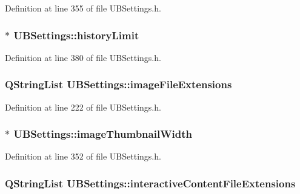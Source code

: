 Definition at line 355 of file U\-B\-Settings.\-h.

\hypertarget{class_u_b_settings_a7611712c43c9117dc809ba0a9cd4488f}{
\subsubsection[{history\-Limit}]{$\ast$ U\-B\-Settings\-::history\-Limit}}\label{db/d66/class_u_b_settings_a7611712c43c9117dc809ba0a9cd4488f}


Definition at line 380 of file U\-B\-Settings.\-h.

\hypertarget{class_u_b_settings_aafb3902650405393aa5b1fee66a59159}{
\subsubsection[{image\-File\-Extensions}]{\setlength{\rightskip}{0pt plus 5cm}Q\-String\-List U\-B\-Settings\-::image\-File\-Extensions\hspace{0.3cm}{\ttfamily [static]}}}\label{db/d66/class_u_b_settings_aafb3902650405393aa5b1fee66a59159}


Definition at line 222 of file U\-B\-Settings.\-h.

\hypertarget{class_u_b_settings_a0b93ca2ce7cf596982b1611393fd900f}{
\subsubsection[{image\-Thumbnail\-Width}]{$\ast$ U\-B\-Settings\-::image\-Thumbnail\-Width}}\label{db/d66/class_u_b_settings_a0b93ca2ce7cf596982b1611393fd900f}


Definition at line 352 of file U\-B\-Settings.\-h.

\hypertarget{class_u_b_settings_ac280e585edabc97aa1c8fc815db8a488}{
\subsubsection[{interactive\-Content\-File\-Extensions}]{\setlength{\rightskip}{0pt plus 5cm}Q\-String\-List U\-B\-Settings\-::interactive\-Content\-File\-Extensions\hspace{0.3cm}{\ttfamily [static]}}}\label{db/d66/class_u_b_settings_ac280e585edabc97aa1c8fc815db8a488}


